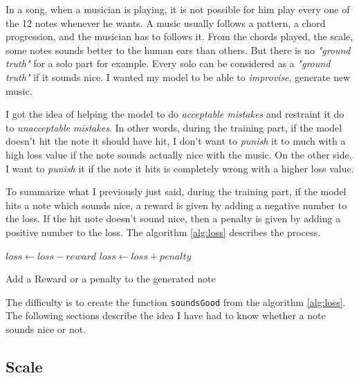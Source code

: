 \documentclass[12pt]{report}
\begin{document}
In a song, when a musician is playing, it is not possible for him play every one of the 12 notes whenever he wants.
A music usually follows a pattern, a chord progression, and the musician has to follows it.
From the chords played, the scale, some notes sounds better to the human ears than others.
But there is no \textit{"ground truth"} for a solo part for example.
Every solo can be considered as a \textit{"ground truth"} if it sounds nice.
I wanted my model to be able to \textit{improvise}, generate new music.

I got the idea of helping the model to do \textit{acceptable mistakes} and restraint it do to \textit{unacceptable mistakes}.
In other words, during the training part, if the model doesn't hit the note it should have hit, I don't want to \textit{punish} it to much with a high loss value if the note sounds actually nice with the music.
On the other side, I want to \textit{punish} it if the note it hits is completely wrong with a higher loss value.

To summarize what I previously just said, during the training part, if the model hits a note which sounds nice, a reward is given by adding a negative number to the loss.
If the hit note doesn't sound nice, then a penalty is given by adding a positive number to the loss.
The algorithm \ref{alg:loss} describes the process.

\begin{algorithm}
    \begin{algorithmic}[1]
        \Statex
                \State $loss \gets loss - reward$
            \Else
                \State $loss \gets loss + penalty$
            \EndIf
            \State {}
        \EndFunction
    \end{algorithmic}
    \caption{Add a Reward or a penalty to the generated note}
    \label{alg:loss}
\end{algorithm}

The difficulty is to create the function \texttt{soundsGood} from the algorithm \ref{alg:loss}.
The following sections describe the idea I have had to know whether a note sounds nice or not.

\subsection{Scale}
\label{sec:scale}
\end{document}
